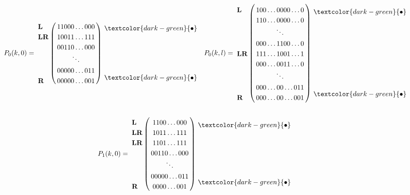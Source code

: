 \documentclass[12pt]{book}
\theoremstyle{plain}
\theoremstyle{remark}
\begin{document}
\begin{figure}[H]
	\centering
	\footnotesize{
		\begin{align*}	
		P_0(k,0) =  \bordermatrix{ & \cr
		\textbf{L} & 1 1 0 0 0  \ldots 0 0 0   \cr
		\textbf{LR} & 1 0 0 1 1 \ldots 1 1 1 \cr
					     & 0 0  1  1  0  \ldots 0 0 0 \cr
						 &  \ddots  \cr
						& 0 0 0 0 0 \ldots  0 1 1  \cr
		\textbf{R} & 0 0 0 0 0 \ldots 0 0 1  }\
	 \begin{matrix}
	  \textcolor{dark-green}{\bullet} \\ \\ \\ \\ \\ \\ \textcolor{dark-green}{\bullet}
	  \end{matrix}
		&&
		P_0(k,l) =  \bordermatrix{ & \cr
		\textbf{L}& 1 0 0 \ldots 0 0 0 0 \ldots 0 \cr
					  & 1 1 0 \ldots 0 0 0 0  \ldots 0 \cr
					  &  \ddots \cr
					 & 0 0 0 \ldots 1 1 0 0 \ldots 0 \cr
	\textbf{LR} & 1 1 1 \ldots 1 0 0 1 \ldots 1 \cr
					 & 0 0 0 \ldots 0 0 1 1  \ldots 0 \cr
					 & \ddots \cr
					& 0 0 0 \ldots 0 0 \ldots 0 1 1 \cr
		\textbf{R} & 0 0 0 \ldots 0 0 \ldots 0 0 1 }\
	\begin{matrix}
	  \textcolor{dark-green}{\bullet} \\ \\ \\ \\ \\ \\ \\ \\ \\ \\ \textcolor{dark-green}{\bullet}
	  \end{matrix}
	\end{align*}
	\begin{align*}
		P_1(k,0) = \bordermatrix{ & \cr
		\textbf{L} & 1 1 0 0  \ldots 0 0 0   \cr
		\textbf{LR} & 1 0 1 1 \ldots 1 1 1 \cr
		\textbf{LR} & 1 1 0 1 \ldots 1 1 1 \cr
					     & 0 0  1  1  0  \ldots 0 0 0 \cr
						 &  \ddots  \cr
						& 0 0 0 0 0 \ldots  0 1 1  \cr
		\textbf{R} & 0 0 0 0 \ldots 0 0 1  }\
	 \begin{matrix}
	  \textcolor{dark-green}{\bullet} \\ \\ \\ \\ \\ \\ \\ \textcolor{dark-green}{\bullet}

\end{matrix}
\end{align*}}
\end{figure}
\end{document}
